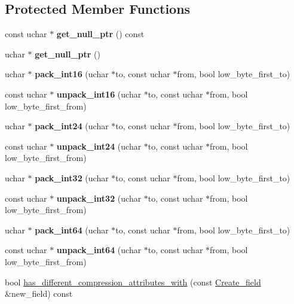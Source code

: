 \subsection*{Protected Member Functions}
\begin{DoxyCompactItemize}
\item 
\mbox{\label{classField_a647fa1175f25a9b6b733cd20888c7ba2}} 
const uchar $\ast$ {\bfseries get\+\_\+null\+\_\+ptr} () const
\item 
\mbox{\label{classField_a40d8da4ebcc2e54aef91a3a1522d55cd}} 
uchar $\ast$ {\bfseries get\+\_\+null\+\_\+ptr} ()
\item 
\mbox{\label{classField_a14696e796958fab4ab072c57e90bee7d}} 
uchar $\ast$ {\bfseries pack\+\_\+int16} (uchar $\ast$to, const uchar $\ast$from, bool low\+\_\+byte\+\_\+first\+\_\+to)
\item 
\mbox{\label{classField_a3161838fdb0891dc795002276681921a}} 
const uchar $\ast$ {\bfseries unpack\+\_\+int16} (uchar $\ast$to, const uchar $\ast$from, bool low\+\_\+byte\+\_\+first\+\_\+from)
\item 
\mbox{\label{classField_a919a08afe68f8762cf1a132356ab3715}} 
uchar $\ast$ {\bfseries pack\+\_\+int24} (uchar $\ast$to, const uchar $\ast$from, bool low\+\_\+byte\+\_\+first\+\_\+to)
\item 
\mbox{\label{classField_ae15d65b9e6de3a46c1a5b1a93015c2a2}} 
const uchar $\ast$ {\bfseries unpack\+\_\+int24} (uchar $\ast$to, const uchar $\ast$from, bool low\+\_\+byte\+\_\+first\+\_\+from)
\item 
\mbox{\label{classField_afb22216fc116347acc5e19579f51cb25}} 
uchar $\ast$ {\bfseries pack\+\_\+int32} (uchar $\ast$to, const uchar $\ast$from, bool low\+\_\+byte\+\_\+first\+\_\+to)
\item 
\mbox{\label{classField_a0c1f03e17d29b6e7544988065a93f510}} 
const uchar $\ast$ {\bfseries unpack\+\_\+int32} (uchar $\ast$to, const uchar $\ast$from, bool low\+\_\+byte\+\_\+first\+\_\+from)
\item 
\mbox{\label{classField_a4e43bc91d9525852b144eea5d6730ba1}} 
uchar $\ast$ {\bfseries pack\+\_\+int64} (uchar $\ast$to, const uchar $\ast$from, bool low\+\_\+byte\+\_\+first\+\_\+to)
\item 
\mbox{\label{classField_a08da8f036685bb5366b3dc691be2a695}} 
const uchar $\ast$ {\bfseries unpack\+\_\+int64} (uchar $\ast$to, const uchar $\ast$from, bool low\+\_\+byte\+\_\+first\+\_\+from)
\item 
bool \mbox{\hyperlink{classField_a05e0489ef2245b6f3e7f6d172569f36e}{has\+\_\+different\+\_\+compression\+\_\+attributes\+\_\+with}} (const \mbox{\hyperlink{classCreate__field}{Create\+\_\+field}} \&new\+\_\+field) const
\end{DoxyCompactItemize}
